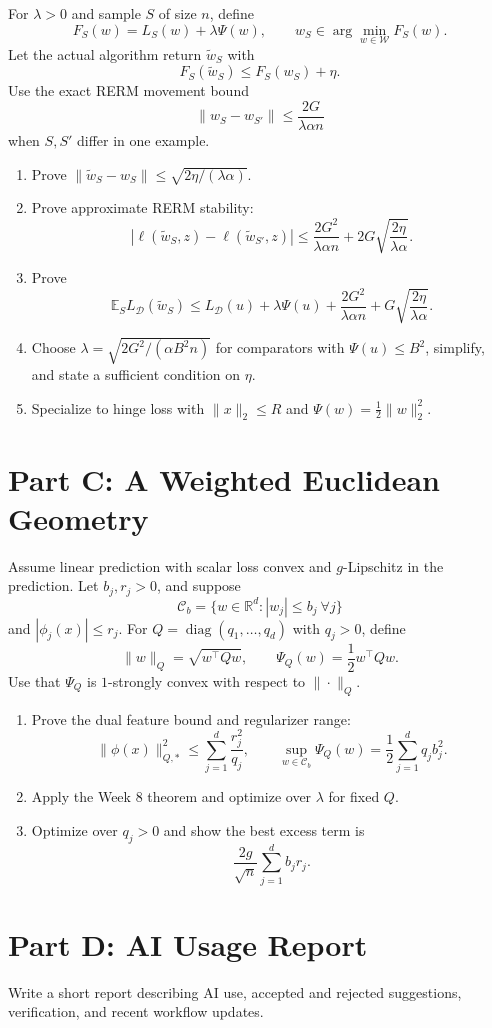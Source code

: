 \documentclass{article}
\begin{document}
For $\lambda>0$ and sample $S$ of size $n$, define
$$
F_S(w)=L_S(w)+\lambda\Psi(w),
\qquad
w_S\in\arg\min_{w\in\mathcal{W}}F_S(w).
$$
Let the actual algorithm return $\widetilde{w}_S$ with
$$
F_S(\widetilde{w}_S)\le F_S(w_S)+\eta.
$$
Use the exact RERM movement bound
$$
\|w_S-w_{S'}\|\le \frac{2G}{\lambda\alpha n}
$$
when $S,S'$ differ in one example.

\begin{enumerate}
\item Prove $\|\widetilde{w}_S-w_S\|\le \sqrt{2\eta/(\lambda\alpha)}$.
\item Prove approximate RERM stability:
$$
|\ell(\widetilde{w}_S,z)-\ell(\widetilde{w}_{S'},z)|
\le
\frac{2G^2}{\lambda\alpha n}
+
2G\sqrt{\frac{2\eta}{\lambda\alpha}}.
$$
\item Prove
$$
\mathbb{E}_S L_{\mathcal{D}}(\widetilde{w}_S)
\le
L_{\mathcal{D}}(u)+\lambda\Psi(u)+\frac{2G^2}{\lambda\alpha n}
+
G\sqrt{\frac{2\eta}{\lambda\alpha}}.
$$
\item Choose $\lambda=\sqrt{2G^2/(\alpha B^2 n)}$ for comparators with $\Psi(u)\le B^2$, simplify, and state a sufficient condition on $\eta$.
\item Specialize to hinge loss with $\|x\|_2\le R$ and $\Psi(w)=\frac12\|w\|_2^2$.
\end{enumerate}

\section{Part C: A Weighted Euclidean Geometry}

Assume linear prediction with scalar loss convex and $g$-Lipschitz in the prediction. Let $b_j,r_j>0$, and suppose
$$
\mathcal{C}_b=\{w\in\mathbb{R}^d: |w_j|\le b_j\ \forall j\}
$$
and $|\phi_j(x)|\le r_j$. For $Q=\operatorname{diag}(q_1,\dots,q_d)$ with $q_j>0$, define
$$
\|w\|_Q=\sqrt{w^\top Qw},
\qquad
\Psi_Q(w)=\frac12 w^\top Qw.
$$
Use that $\Psi_Q$ is $1$-strongly convex with respect to $\|\cdot\|_Q$.

\begin{enumerate}
\item Prove the dual feature bound and regularizer range:
$$
\|\phi(x)\|_{Q,*}^2\le \sum_{j=1}^d \frac{r_j^2}{q_j},
\qquad
\sup_{w\in\mathcal{C}_b}\Psi_Q(w)=\frac12\sum_{j=1}^d q_jb_j^2.
$$
\item Apply the Week 8 theorem and optimize over $\lambda$ for fixed $Q$.
\item Optimize over $q_j>0$ and show the best excess term is
$$
\frac{2g}{\sqrt{n}}\sum_{j=1}^d b_jr_j.
$$
\end{enumerate}

\section{Part D: AI Usage Report}

Write a short report describing AI use, accepted and rejected suggestions, verification, and recent workflow updates.
\end{document}
